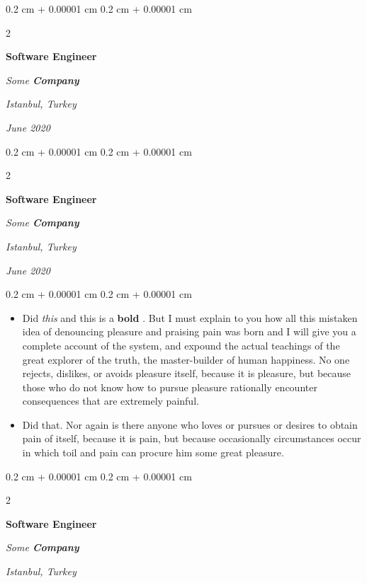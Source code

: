 \documentclass[10pt, letterpaper]{article}
\newenvironment{highlights}{
    \begin{itemize}[
        topsep=0.10 cm,
        parsep=0.10 cm,
        partopsep=0pt,
        itemsep=0pt,
        leftmargin=0.4 cm + 10pt
    ]
}{
    \end{itemize}
} %
\newenvironment{onecolentry}{
    \begin{adjustwidth}{
        0.2 cm + 0.00001 cm
    }{
        0.2 cm + 0.00001 cm
    }
}{
    \end{adjustwidth}
} %
\newenvironment{twocolentry}[2][]{
    \onecolentry
    \def\secondColumn{#2}
    \setcolumnwidth{\fill, 4.5 cm}
    \begin{paracol}{2}
}{
    \switchcolumn \raggedleft \secondColumn
    \end{paracol}
    \endonecolentry
} %
\let\hrefWithoutArrow\href
\renewcommand{\href}[2]{\hrefWithoutArrow{#1}{\ifthenelse{\equal{#2}{}}{ }{#2 }\raisebox{.15ex}{\footnotesize \faExternalLink*}}}
\begin{document}
        \vspace{0.2 cm}

        \begin{twocolentry}{
        \textit{Istanbul, Turkey}    
            
        \textit{June 2020}}
            \textbf{Software Engineer}
            
            \textit{Some \textbf{Company}}
        \end{twocolentry}



        \vspace{0.2 cm}

        \begin{twocolentry}{
        \textit{Istanbul, Turkey}    
            
        \textit{June 2020}}
            \textbf{Software Engineer}
            
            \textit{Some \textbf{Company}}
        \end{twocolentry}

        \vspace{0.10 cm}
        \begin{onecolentry}
            \begin{highlights}
                \item Did \textit{this} and this is a \textbf{bold} \href{https://example.com}{link}. But I must explain to you how all this mistaken idea of denouncing pleasure and praising pain was born and I will give you a complete account of the system, and expound the actual teachings of the great explorer of the truth, the master-builder of human happiness. No one rejects, dislikes, or avoids pleasure itself, because it is pleasure, but because those who do not know how to pursue pleasure rationally encounter consequences that are extremely painful.
                \item Did that. Nor again is there anyone who loves or pursues or desires to obtain pain of itself, because it is pain, but because occasionally circumstances occur in which toil and pain can procure him some great pleasure.
            \end{highlights}
        \end{onecolentry}


        \vspace{0.2 cm}

        \begin{twocolentry}{
        \textit{Istanbul, Turkey}    
            
        }
            \textbf{Software Engineer}
            
            \textit{Some \textbf{Company}}
        \end{twocolentry}
\end{document}
